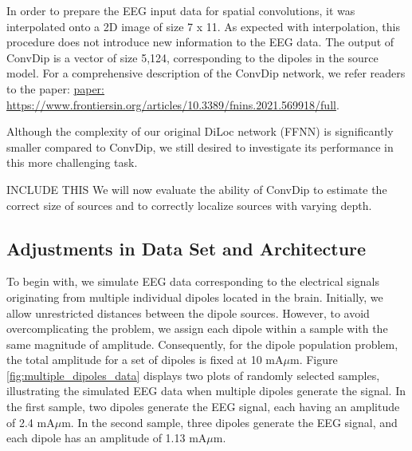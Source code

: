 \documentclass[a4paper, UKenglish, 11pt]{uiomaster}
\begin{document}
In order to prepare the EEG input data for spatial convolutions, it was interpolated onto a 2D image of size 7 x 11. As expected with interpolation, this procedure does not introduce new information to the EEG data. The output of ConvDip is a vector of size 5,124, corresponding to the dipoles in the source model. For a comprehensive description of the ConvDip network, we refer readers to the paper: \href{https://www.frontiersin.org/articles/10.3389/fnins.2021.569918/full}{paper: https://www.frontiersin.org/articles/10.3389/fnins.2021.569918/full}.

Although the complexity of our original DiLoc network (FFNN) is significantly smaller compared to ConvDip, we still desired to investigate its performance in this more challenging task.

INCLUDE THIS
We will now evaluate the ability of ConvDip to estimate the correct size of sources and to correctly localize sources with varying depth.


\subsection{Adjustments in Data Set and Architecture}

To begin with, we simulate EEG data corresponding to the electrical signals originating from multiple individual dipoles located in the brain. Initially, we allow unrestricted distances between the dipole sources. However, to avoid overcomplicating the problem, we assign each dipole within a sample with the same magnitude of amplitude. Consequently, for the dipole population problem, the total amplitude for a set of dipoles is fixed at 10 mA$\mu$m. Figure \ref{fig:multiple_dipoles_data} displays two plots of randomly selected samples, illustrating the simulated EEG data when multiple dipoles generate the signal. In the first sample, two dipoles generate the EEG signal, each having an amplitude of 2.4 mA$\mu$m. In the second sample, three dipoles generate the EEG signal, and each dipole has an amplitude of 1.13 mA$\mu$m.
\end{document}
